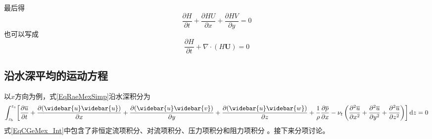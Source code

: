                            最后得
                            \begin{equation}
                              \frac{\partial H}{\partial t} +
                              \frac{\partial HU}{\partial x} +
                              \frac{\partial HV}{\partial y}
                              =
                              0
                            \end{equation}
                            也可以写成
                            \begin{equation}
                              \frac{\partial H}{\partial t} +
                              \nabla\cdot(H\mathbf{U})
                              =
                              0
                            \end{equation}

                            \subsection{沿水深平均的运动方程}
                            以$x$方向为例，式\eqref{EqRaeMexSimp}沿水深积分为
                            \begin{equation}
                              \int_{z_{b}}^{ z_{s}}\!
                              \left[
                                \frac{\partial \overline{u}}{\partial t} +
                                \frac{\partial (\widebar{u}\widebar{u})}{\partial x} +
                                \frac{\partial (\widebar{u}\widebar{v})}{\partial y} +
                                \frac{\partial (\widebar{u}\widebar{w})}{\partial z} +
                                \frac{1}{\rho}\frac{\partial \overline{p}}{\partial x} -
                                \nu_{t}
                                \left(
                                  \frac{\partial^{2} \overline{u}}{\partial x^{2}} +
                                  \frac{\partial^{2} \overline{u}}{\partial y^{2}} +
                                  \frac{\partial^{2} \overline{u}}{\partial z^{2}}
                                \right)
                              \right]
                              \mathrm{d}z
                              =
                              0
                              \label{EqCGeMex_Int}
                            \end{equation}
                            式\eqref{EqCGeMex_Int}中包含了非恒定流项积分、对流项积分、压力项积分和阻力项积分
                            。接下来分项讨论。

